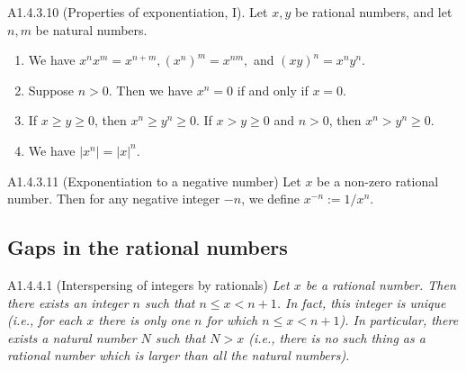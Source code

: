\begin{proposition}{A1.4.3.10}
    (Properties of exponentiation, I). Let $x, y$ be rational numbers, and let $n, m$ be natural numbers.
    \begin{enumerate}
        \item We have $x^n x^m = x^{n + m}, (x^n)^m = x^{nm}, $ and $(xy)^n = x^n y^n$.
        \item Suppose $n > 0$. Then we have $x^n = 0$ if and only if $x = 0$.
        \item If $x \geq y \geq 0$, then $x^n \geq y^n \geq 0$. If $x > y \geq 0$ and $n > 0$, then $x^n > y^n \geq 0$.
        \item We have $|x^n| = |x|^n$.
    \end{enumerate}
\end{proposition}

\begin{definition}{A1.4.3.11}
    (Exponentiation to a negative number) Let $x$ be a non-zero rational number. Then for any negative integer $-n$, we
    define $x^{-n} := 1/x^n$.
\end{definition}


\subsection{Gaps in the rational numbers}
\begin{proposition}{A1.4.4.1}
    (Interspersing of integers by rationals) \emph{Let $x$ be a rational number. Then there exists an integer $n$ such
    that $n \leq x < n + 1$. In fact, this integer is unique (i.e., for each $x$ there is only one $n$ for which
    $n \leq x < n + 1$). In particular, there exists a natural number $N$ such that $N > x$ (i.e., there is no such
    thing as a rational number which is larger than all the natural numbers).}
\end{proposition}

